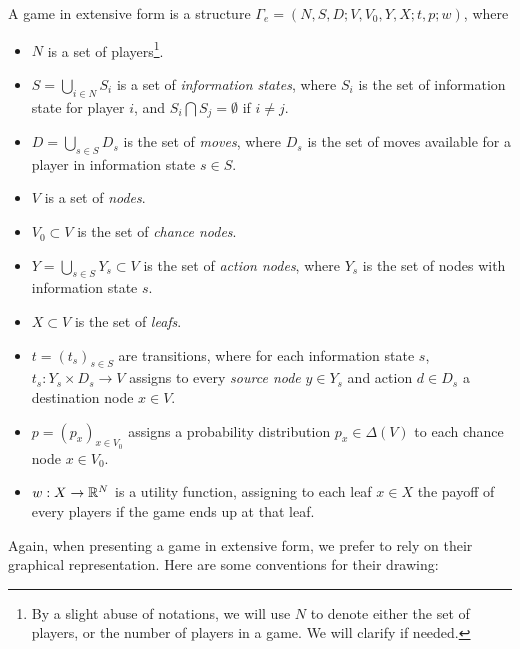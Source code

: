 \begin{definition}
\label{def:extform}
A game in extensive form is a structure $\Gamma_e = (N, S, D; V, V_0, Y, X; t, p; w)$,
where
\begin{itemize}
\item $N$ is a set of players\footnote{By a slight abuse of notations, we will use $N$ to denote either the set of players, or the number of players in a game. We will clarify if needed.}.
\item $S = \bigcup_{i \in N} S_i$ is a set of \emph{information states}, where $S_i$ is the set of information state for player $i$, and $S_i \bigcap S_j = \emptyset$ if $i  \neq j$.
\item $D = \bigcup_{s \in S} D_s$ is the set of \emph{moves}, where $D_s$ is the set of moves available for a  player in information state $s \in S$.
\item $V$ is a set of \emph{nodes}.
\item $V_0 \subset V$ is the set of \emph{chance nodes}.
\item $Y = \bigcup_{s \in S} Y_s \subset V$ is the set of \emph{action nodes}, where $Y_s$ is the set of nodes with information state $s$.
\item $X \subset V$ is the set of \emph{leafs}.
\item $t = (t_s)_{s \in S}$ are transitions, where for each information state $s$,  $t_s : Y_s \times D_s \rightarrow V$ assigns to every \emph{source node} $y \in Y_s$ and action $d \in D_s$ a destination node $x \in V$.
\item $p = (p_{x})_{x \in V_0}$ assigns a probability distribution $p_x \in \Delta(V)$ to each chance node $x \in V_0$.
\item $w : X \rightarrow \mathbb{R}^N$ is a utility function, assigning to each leaf $x \in X$ the payoff of every players if the game ends up at that leaf.
\end{itemize}
\end{definition}

Again, when presenting a game in extensive form, we prefer to rely on their graphical representation. Here are some conventions for their drawing:


